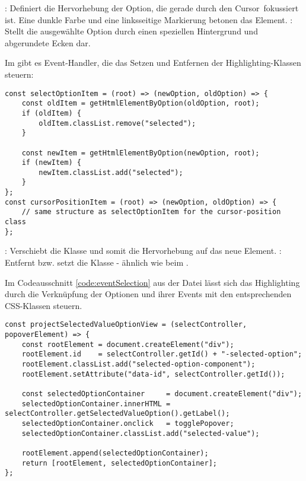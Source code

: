 : Definiert die Hervorhebung der Option, die gerade durch den Cursor\footnotemark \ fokussiert ist.
Eine dunkle Farbe und eine linksseitige Markierung betonen das Element.
: Stellt die ausgewählte Option durch einen speziellen Hintergrund und abgerundete Ecken dar.

Im  gibt es Event-Handler, die das Setzen und Entfernen der Highlighting-Klassen steuern:

\begin{lstlisting}[style = htmlcssjs, caption = Steuerung der Highlighting-Klassen, label = code:highlightChange]
const selectOptionItem = (root) => (newOption, oldOption) => {
    const oldItem = getHtmlElementByOption(oldOption, root);
    if (oldItem) {
        oldItem.classList.remove("selected");
    }

    const newItem = getHtmlElementByOption(newOption, root);
    if (newItem) {
        newItem.classList.add("selected");
    }
}; 
const cursorPositionItem = (root) => (newOption, oldOption) => {
    // same structure as selectOptionItem for the cursor-position class
}; 
\end{lstlisting}

: Verschiebt die Klasse  und somit die Hervorhebung auf das neue Element.
: Entfernt bzw. setzt die Klasse  - ähnlich wie beim . 

Im Codeausschnitt \ref{code:eventSelection} aus der Datei  lässt sich das Highlighting 
durch die Verknüpfung der Optionen und ihrer Events mit den entsprechenden CSS-Klassen steuern.

\begin{lstlisting}[style = htmlcssjs, caption = Event-Handling für die Auswahl einer Option, label = code:eventSelection]
const projectSelectedValueOptionView = (selectController, popoverElement) => {
    const rootElement = document.createElement("div");
    rootElement.id    = selectController.getId() + "-selected-option";
    rootElement.classList.add("selected-option-component");
    rootElement.setAttribute("data-id", selectController.getId());
    
    const selectedOptionContainer     = document.createElement("div");
    selectedOptionContainer.innerHTML = selectController.getSelectedValueOption().getLabel();
    selectedOptionContainer.onclick   = togglePopover;
    selectedOptionContainer.classList.add("selected-value");
    
    rootElement.append(selectedOptionContainer);
    return [rootElement, selectedOptionContainer];
}; 
\end{lstlisting}

